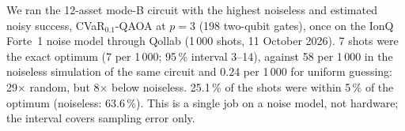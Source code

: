 We ran the 12-asset mode-B circuit with the highest noiseless and estimated noisy success, CVaR$_{0.1}$-QAOA at $p=3$ (198 two-qubit gates), once on the IonQ Forte~1 noise model through Qollab (1\,000 shots, 11 October 2026). 7 shots were the exact optimum (7 per 1\,000; 95\,\% interval 3--14), against 58 per 1\,000 in the noiseless simulation of the same circuit and 0.24 per 1\,000 for uniform guessing: 29$\times$ random, but 8$\times$ below noiseless. 25.1\,\% of the shots were within 5\,\% of the optimum (noiseless: 63.6\,\%). This is a single job on a noise model, not hardware; the interval covers sampling error only.
